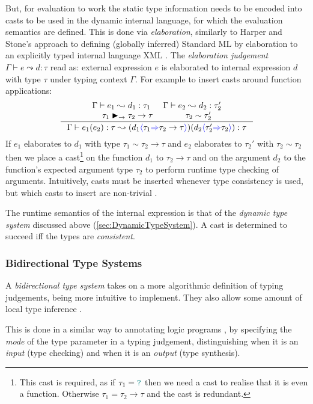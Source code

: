 But, for evaluation to work the static type information needs to be encoded into casts to be used in the dynamic internal language, for which the evaluation semantics are defined. This is done via \textit{elaboration}, similarly to Harper and Stone's approach to defining (globally inferred) Standard ML \cite{StandardMLTypeTheory} by elaboration to an explicitly typed internal language XML \cite{CoreXML}. The \textit{elaboration judgement} $\Gamma \vdash e \leadsto d : \tau$ read as: external expression $e$ is elaborated to internal expression $d$ with type $\tau$ under typing context $\Gamma$. For example to insert casts around function applications:
\[\inference{\Gamma \vdash e_1 \leadsto d_1 : \tau_1 & \Gamma \vdash e_2 \leadsto d_2 : \tau_2' \\ \tau_1 \funmatch \tau_2 \to \tau  & \tau_2 \sim \tau_2'}{\Gamma \vdash e_1(e_2) : \tau \leadsto (d_1\scast{\tau_1}{\tau_2 \to \tau})(d_2\scast{\tau_2'}{\tau_2}) : \tau}\]
If $e_1$ elaborates to $d_1$ with type $\tau_1 \sim \tau_2 \to \tau$ and $e_2$ elaborates to $\tau_2'$ with $\tau_2 \sim \tau_2$ then we place a cast\footnote{This cast is required, as if $\tau_1 = {\color{teal}\texttt{?}}$ then we need a cast to realise that it is even a function. Otherwise $\tau_1 = \tau_2 \to \tau$ and the cast is redundant.} on the function $d_1$ to $\tau_2 \to \tau$ and on the argument $d_2$ to the function's expected argument type $\tau_2$ to perform runtime type checking of arguments.
Intuitively, casts must be inserted whenever type consistency is used, but which casts to insert are non-trivial \cite{Gradualizer}.

The runtime semantics of the internal expression is that of the \textit{dynamic type system} discussed above (\ref{sec:DynamicTypeSystem}). A cast is determined to succeed iff the types are \textit{consistent}.

\subsubsection{Bidirectional Type Systems}\label{sec:BidirectionalTypeSystem}
A \textit{bidirectional type system} \cite{BidirectionalTypes} takes on a more algorithmic definition of typing judgements, being more intuitive to implement. They also allow some amount of local type inference \cite{LocalInference}.

This is done in a similar way to annotating logic programs \cite[123]{LogicProg}, by specifying the \textit{mode} of the type parameter in a typing judgement, distinguishing when it is an \textit{input} (type checking) and when it is an \textit{output} (type synthesis).


